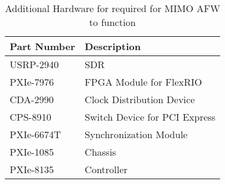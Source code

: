 \begin{landscape}%
\begin{table}[H]
    \begin{center}
        \begin{tabular}{|l|l|}
        \hline
            \textbf{Part Number} & \textbf{Description}          \\ \hline
            USRP-2940            & SDR                           \\ \hline
            PXIe-7976            & FPGA Module for FlexRIO       \\ \hline
            CDA-2990             & Clock Distribution Device     \\ \hline
            CPS-8910             & Switch Device for PCI Express \\ \hline
            PXIe-6674T           & Synchronization Module        \\ \hline
            PXIe-1085            & Chassis                       \\ \hline
            PXIe-8135            & Controller                    \\ \hline
        \end{tabular}
    \end{center}
    \caption{Additional Hardware for required for MIMO AFW to function}
    \label{tb:MIMOAFWPartsList}
\end{table}


\end{landscape}
